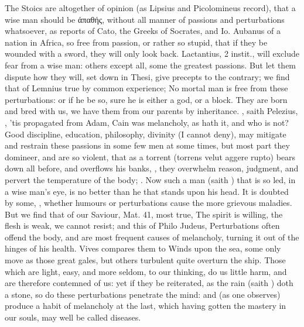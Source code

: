 {{The Stoics are altogether of opinion (as Lipsius and
Picolomineus record), that a wise man should be \textgreek{ἀπαθής}, without
all manner of passions and perturbations whatsoever, as \Seneca
reports of Cato, the  Greeks of Socrates, and Io. Aubanus
of a nation in Africa, so free from passion, or rather so stupid, that
if they be wounded with a sword, they will only look back.
Lactantius, 2 instit., will exclude fear from a wise man: others
except all, some the greatest passions. But let them dispute how they
will, set down in Thesi, give precepts to the contrary; we find that of
Lemnius true by common experience; No mortal man is free from
these perturbations: or if he be so, sure he is either a god, or a
block. They are born and bred with us, we have them from our parents by
inheritance. , saith
Pelezius, , 'tis propagated from
Adam, Cain was melancholy, as \Austin{} hath it, and who is not?
Good discipline, education, philosophy, divinity (I cannot deny), may
mitigate and restrain these passions in some few men at some times, but
most part they domineer, and are so violent, that as a torrent
(torrens velut aggere rupto) bears down all before, and overflows his
banks, , they overwhelm reason, judgment, and pervert the
temperature of the body; . Now such a man (saith \Austin{}) that is so led, in a wise
man's eye, is no better than he that stands upon his head. It is
doubted by some, ,
whether humours or perturbations cause the more grievous maladies. But
we find that of our Saviour, Mat.  41, most true, The spirit is
willing, the flesh is weak, we cannot resist; and this of Philo
Judeus, Perturbations often offend the body, and are most frequent
causes of melancholy, turning it out of the hinges of his health. Vives
compares them to Winds upon the sea, some only move as those
great gales, but others turbulent quite overturn the ship. Those which
are light, easy, and more seldom, to our thinking, do us little harm,
and are therefore contemned of us: yet if they be reiterated, as
the rain (saith \Austin{}) doth a stone, so do these perturbations
penetrate the mind: and (as one observes) produce a habit of
melancholy at the last, which having gotten the mastery in our souls,
may well be called diseases.

}}
